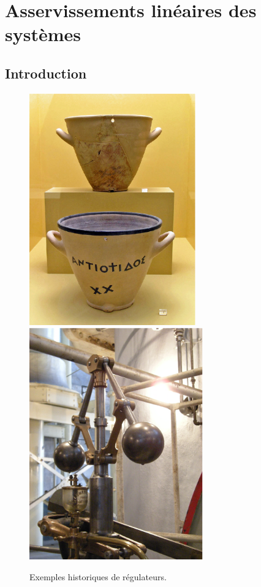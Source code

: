 \chapter{Asservissements linéaires des systèmes\label{chap-asservis}}
\minitoc
\newpage
\section{Introduction}


\captionsetup{width=0.45\linewidth}
\begin{figure}[!t]
    \centering
        \includegraphics[width=0.5\linewidth,height=10cm]{fig/AGMA_Clepsydre_m.eps}
        \label{fig-clep}
        \includegraphics[width=0.5\linewidth,height=10cm]{fig/Georgetown_PowerPlant_Museum_m.eps}
        \label{fig-watt}
    \caption{Exemples historiques de régulateurs.\label{fig-hist}}
\end{figure}

